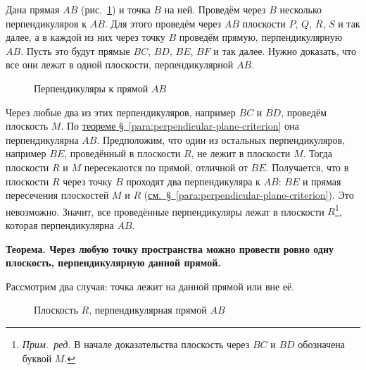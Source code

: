 Дана прямая \(AB\) (рис.~\ref{fig:kiselev-stereo-306}) и точка \(B\) на ней. Проведём через \(B\) несколько перпендикуляров к \(AB\). Для этого проведём через \(AB\) плоскости \(P\), \(Q\), \(R\), \(S\) и так далее, а в каждой из них через точку \(B\) проведём прямую, перпендикулярную \(AB\). Пусть это будут прямые \(BC\), \(BD\), \(BE\), \(BF\) и так далее. Нужно доказать, что все они лежат в одной плоскости, перпендикулярной \(AB\).

\begin{figure}[htbp]
    \centering
    \renewcommand{\thefigure}{306}
    \captionsetup{name=Рис.,labelsep=period}
    
    \caption{Перпендикуляры к прямой \(AB\)}\label{fig:kiselev-stereo-306}
\end{figure}

Через любые два из этих перпендикуляров, например \(BC\) и \(BD\), проведём плоскость \(M\). По \hyperref[para:perpendicular-plane-criterion]{теореме §~\ref*{para:perpendicular-plane-criterion}} она перпендикулярна \(AB\). Предположим, что один из остальных перпендикуляров, например \(BE\), проведённый в плоскости \(R\), не лежит в плоскости \(M\). Тогда плоскости \(R\) и \(M\) пересекаются по прямой, отличной от \(BE\). Получается, что в плоскости \(R\) через точку \(B\) проходят два перпендикуляра к \(AB\): \(BE\) и прямая пересечения плоскостей \(M\) и \(R\) (\hyperref[para:perpendicular-plane-criterion]{см.~§~\ref*{para:perpendicular-plane-criterion}}). Это невозможно. Значит, все проведённые перпендикуляры лежат в плоскости \(R\)\footnote{\emph{Прим.~ред.} В начале доказательства плоскость через \(BC\) и \(BD\) обозначена буквой \(M\).}, которая перпендикулярна \(AB\).

 \textbf{Теорема. Через любую точку пространства можно провести ровно одну плоскость, перпендикулярную данной прямой.}

Рассмотрим два случая: точка лежит на данной прямой или вне её.

\begin{figure}[htbp]
    \centering
    \renewcommand{\thefigure}{307}
    \captionsetup{name=Рис.,labelsep=period}
    
    \caption{Плоскость \(R\), перпендикулярная прямой \(AB\)}\label{fig:kiselev-stereo-307}
\end{figure}

